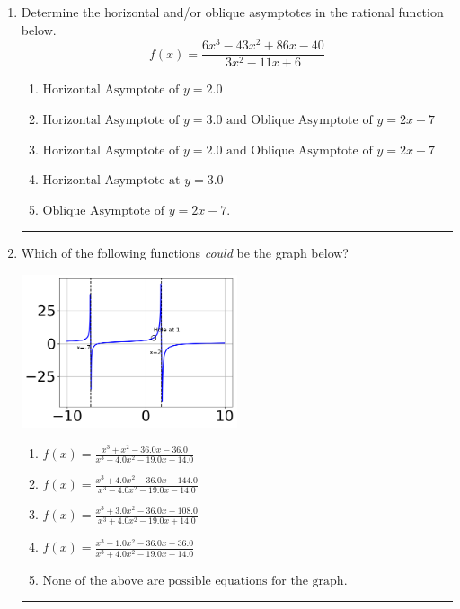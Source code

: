 \documentclass[14pt]{extbook}
\newcommand{\litem}[1]{\item#1\hspace*{-1cm}\rule{\textwidth}{0.4pt}}
\begin{document}
\begin{enumerate}
\litem{
Determine the horizontal and/or oblique asymptotes in the rational function below.\[ f(x) = \frac{6x^{3} -43 x^{2} +86 x -40}{3x^{2} -11 x + 6} \]\begin{enumerate}[label=\Alph*.]
\item \( \text{Horizontal Asymptote of } y = 2.0  \)
\item \( \text{Horizontal Asymptote of } y = 3.0 \text{ and Oblique Asymptote of } y = 2x -7 \)
\item \( \text{Horizontal Asymptote of } y = 2.0 \text{ and Oblique Asymptote of } y = 2x -7 \)
\item \( \text{Horizontal Asymptote at } y = 3.0 \)
\item \( \text{Oblique Asymptote of } y = 2x -7. \)

\end{enumerate} }
\litem{
Which of the following functions \textit{could} be the graph below?
\begin{center}
    \includegraphics[width=0.5\textwidth]{../Figures/identifyGraphOfRationalFunctionCopyA.png}
\end{center}
\begin{enumerate}[label=\Alph*.]
\item \( f(x)=\frac{x^{3} + x^{2} -36.0 x -36.0}{x^{3} -4.0 x^{2} -19.0 x -14.0} \)
\item \( f(x)=\frac{x^{3} +4.0 x^{2} -36.0 x -144.0}{x^{3} -4.0 x^{2} -19.0 x -14.0} \)
\item \( f(x)=\frac{x^{3} +3.0 x^{2} -36.0 x -108.0}{x^{3} +4.0 x^{2} -19.0 x + 14.0} \)
\item \( f(x)=\frac{x^{3} -1.0 x^{2} -36.0 x + 36.0}{x^{3} +4.0 x^{2} -19.0 x + 14.0} \)
\item \( \text{None of the above are possible equations for the graph.} \)


\end{enumerate}}
\end{enumerate}
\end{document}
